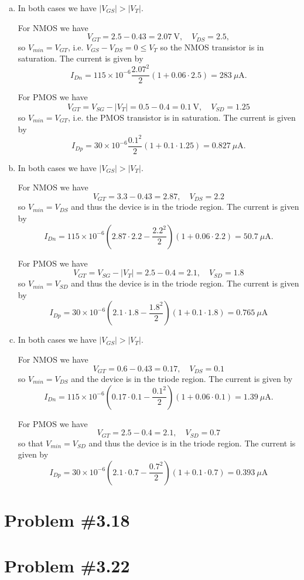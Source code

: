 \documentclass{article}
\begin{document}
\begin{enumerate}[(a)]
  \item{
    In both cases we have $|V_{GS}| > |V_T|$.

    For NMOS we have
    $$
    V_{GT} = 2.5 - 0.43 = 2.07 ~\mathrm{V}, \quad
    V_{DS} = 2.5,
    $$
    so $V_{min} = V_{GT}$, i.e. $V_{GS} - V_{DS} = 0 \leq V_T$ so the
    NMOS transistor is in saturation. The current is given by
    $$
    I_{Dn} = 115 \times 10^{-6} \frac{2.07^2}{2}(1 + 0.06 \cdot 2.5)
          = 283 ~\mu\mathrm{A}.
    $$

    For PMOS we have
    $$
    V_{GT} = V_{SG} - |V_T| = 0.5 - 0.4 = 0.1 ~\mathrm{V}, \quad
    V_{SD} = 1.25
    $$
    so $V_{min} = V_{GT}$, i.e. the PMOS transistor is in
    saturation. The current is given by
    $$
    I_{Dp} = 30 \times 10^{-6} \frac{0.1^2}{2}(1 + 0.1 \cdot 1.25)
          = 0.827 ~\mu\mathrm{A}.
    $$
  }
  \item{
    In both cases we have $|V_{GS}| > |V_T|$.

    For NMOS we have
    $$
    V_{GT} = 3.3 - 0.43 = 2.87, \quad
    V_{DS} = 2.2
    $$
    so $V_{min} = V_{DS}$ and thus the device is in the triode
    region. The current is given by
    $$
    I_{Dn} = 115 \times 10^{-6}
            (2.87 \cdot 2.2 - \frac{2.2^2}{2})
            (1 + 0.06 \cdot 2.2)
          = 50.7 ~\mu\mathrm{A}.
    $$

    For PMOS we have
    $$
    V_{GT} = V_{SG} - |V_T| = 2.5 - 0.4 = 2.1, \quad
    V_{SD} = 1.8
    $$
    so $V_{min} = V_{SD}$ and thus the device is in the triode region.
    The current is given by
    $$
    I_{Dp} = 30 \times 10^{-6}
            (2.1 \cdot 1.8 - \frac{1.8^2}{2})
            (1 + 0.1 \cdot 1.8)
          = 0.765 ~\mu\mathrm{A}
    $$
  }
  \item{
    In both cases we have $|V_{GS}| > |V_T|$.

    For NMOS we have
    $$
    V_{GT} = 0.6 - 0.43 = 0.17, \quad
    V_{DS} = 0.1
    $$
    so $V_{min} = V_{DS}$ and the device is in the triode region.
    The current is given by
    $$
    I_{Dn} = 115 \times 10^{-6}
            (0.17 \cdot 0.1 - \frac{0.1^2}{2})
            (1 + 0.06 \cdot 0.1)
          = 1.39 ~\mu\mathrm{A}.
    $$

    For PMOS we have
    $$
    V_{GT} = 2.5 - 0.4 = 2.1, \quad
    V_{SD} = 0.7
    $$
    so that $V_{min} = V_{SD}$ and thus the device is in the triode
    region. The current is given by
    $$
    I_{Dp} = 30 \times 10^{-6}
            (2.1 \cdot 0.7 - \frac{0.7^2}{2})
            (1 + 0.1 \cdot 0.7)
          = 0.393 ~\mu\mathrm{A}
    $$
  }
\end{enumerate}

\section*{Problem \#3.18}

\section*{Problem \#3.22}
\end{document}
